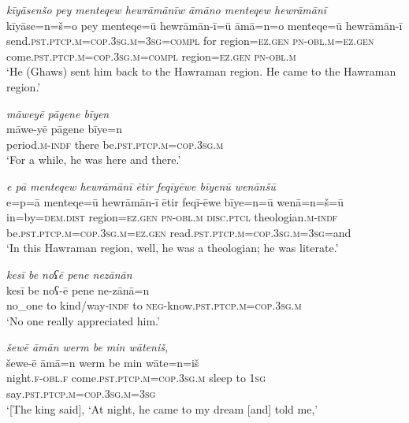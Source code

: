 \ea \label{ZP.21}
\textit{kīyāsenšo pey menteqew hewrāmānīw āmāno menteqew hewrāmānī} \\ 
\gll kīyāse=n=š=o pey menteqe=ū hewrāmān-ī=ū āmā=n=o menteqe=ū hewrāmān-ī \\ 
 send\textsc{.pst}\textsc{.ptcp}\textsc{.m}\textsc{=cop}\textsc{.3sg}\textsc{.m}\textsc{=3sg}\textsc{=compl} for region\textsc{\textsc{=ez.gen}} \textsc{pn}\textsc{-obl}\textsc{.m}\textsc{\textsc{=ez.gen}} come\textsc{.pst}\textsc{.ptcp}\textsc{.m}\textsc{=cop}\textsc{.3sg}\textsc{.m}\textsc{=compl} region\textsc{\textsc{=ez.gen}} \textsc{pn}\textsc{-obl}\textsc{.m} \\ 
\glt `He (Ghaws) sent him back to the Hawraman region. He came to the Hawraman region.'
\z 
 
\ea \label{ZP.22}
\textit{māweyē pāgene bīyen} \\ 
\gll māwe-yē pāgene bīye=n \\ 
 period\textsc{.m}\textsc{-indf} there be\textsc{.pst}\textsc{.ptcp}\textsc{.m}\textsc{=cop}\textsc{.3sg}\textsc{.m} \\ 
\glt `For a while, he was here and there.'
\z 
 
\ea \label{ZP.23}
\textit{e pā menteqew hewrāmānī ētir feqīyēwe bīyenū wenānšū} \\ 
\gll e=p=ā menteqe=ū hewrāmān-ī ētir feqī-ēwe bīye=n=ū wenā=n=š=ū \\ 
 in=by=\textsc{dem.dist} region\textsc{\textsc{=ez.gen}} \textsc{pn}\textsc{-obl}\textsc{.m} \textsc{disc.ptcl} theologian\textsc{.m}\textsc{-indf} be\textsc{.pst}\textsc{.ptcp}\textsc{.m}\textsc{=cop}\textsc{.3sg}\textsc{.m}\textsc{\textsc{=ez.gen}} read\textsc{.pst}\textsc{.ptcp}\textsc{.m}\textsc{=cop}\textsc{.3sg}\textsc{.m}\textsc{=3sg}=and \\ 
\glt `In this Hawraman region, well, he was a theologian; he was literate.'
\z 
 
\ea \label{ZP.24}
\textit{kesī be noʕē pene nezānān} \\ 
\gll kesī be noʕ-ē pene ne-zānā=n \\ 
 no\_one to kind/way\textsc{-indf} to \textsc{neg-}know\textsc{.pst}\textsc{.ptcp}\textsc{.m}\textsc{=cop}\textsc{.3sg}\textsc{.m} \\ 
\glt `No one really appreciated him.'
\z 
 
\ea \label{ZP.32}
\textit{šewē āmān werm be min wāteniš,} \\ 
\gll šewe-ē āmā=n werm be min wāte=n=iš \\ 
 night\textsc{.f}\textsc{-obl}\textsc{.f} come\textsc{.pst}\textsc{.ptcp}\textsc{.m}\textsc{=cop}\textsc{.3sg}\textsc{.m} sleep to \textsc{1sg} say\textsc{.pst}\textsc{.ptcp}\textsc{.m}\textsc{=cop}\textsc{.3sg}\textsc{.m}\textsc{=3sg} \\ 
\glt `[The king said], ‘At night, he came to my dream [and] told me,'
\z 
 
